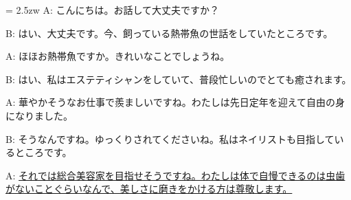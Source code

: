 \documentclass[11pt]{amsart}
\title{}
\author{}
\newenvironment{hangall}[1]{\hangindent = 2.5zw\everypar{\hangindent = 2.5zw}}{}
\begin{document}
\maketitle
\begin{hangall}{}%
A: こんにちは。お話して大丈夫ですか？

B: はい、大丈夫です。今、飼っている熱帯魚の世話をしていたところです。

A: ほほお熱帯魚ですか。きれいなことでしょうね。

B: はい、私はエステティシャンをしていて、普段忙しいのでとても癒されます。

A: 華やかそうなお仕事で羨ましいですね。わたしは先日定年を迎えて自由の身になりました。

B: そうなんですね。ゆっくりされてくださいね。私はネイリストも目指しているところです。

A: \ul{それでは総合美容家を目指せそうですね。わたしは体で自慢できるのは虫歯がないことぐらいなんで、美しさに磨きをかける方は尊敬します。}\end{hangall}
\end{document}
